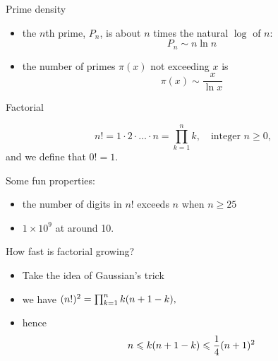 \begin{frame}{Prime density}

\begin{itemize}
    \item the $n$th prime, $P_n$, is about $n$ times the natural $\log$ of $n$: $$P_n \sim n \ln n$$
    \item the number of primes $\pi(x)$ not exceeding $x$ is $$\pi(x) \sim\frac{x}{\ln x}$$
    
\end{itemize}
    
\end{frame}

\begin{frame}{Factorial}
    \begin{definition}[Factorial]
        $$n !=1 \cdot 2 \cdot \ldots \cdot n=\prod_{k=1}^n k, \quad \text{integer } n \geqslant 0,$$ and we define that $0!=1$. 
    \end{definition}

    Some fun properties: 
    \begin{itemize}
        \item the number of digits in $n!$ exceeds $n$ when $n\geq  25$
        \item $1\times 10^9$ at around 10. 
    \end{itemize}
    
    How fast is factorial growing? 
    \begin{itemize}
        \item Take the idea of Gaussian's trick
        \item we have $\small( n !)^2=\prod_{k=1}^n k(n+1-k),$
        \item hence $$\small n \leqslant k(n+1-k) \leqslant \frac{1}{4}(n+1)^2$$

    \end{itemize}
\end{frame}


